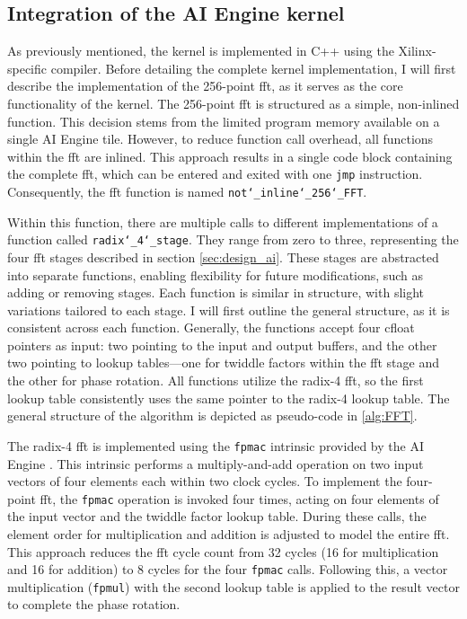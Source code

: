 \subsection{Integration of the AI Engine kernel} \label{sec:aie_im}
As previously mentioned, the kernel is implemented in C++ using the Xilinx-specific compiler. Before detailing the complete kernel implementation, I will first describe the implementation of the 256-point \ac{fft}, as it serves as the core functionality of the kernel. The 256-point \ac{fft} is structured as a simple, non-inlined function. This decision stems from the limited program memory available on a single AI Engine tile. However, to reduce function call overhead, all functions within the \ac{fft} are inlined. This approach results in a single code block containing the complete \ac{fft}, which can be entered and exited with one \texttt{jmp} instruction. Consequently, the \ac{fft} function is named \texttt{not\char`_inline\char`_256\char`_FFT}.\par
Within this function, there are multiple calls to different implementations of a function called \texttt{radix\char`_4\char`_stage}. They range from zero to three, representing the four \ac{fft} stages described in section \ref{sec:design_ai}. These stages are abstracted into separate functions, enabling flexibility for future modifications, such as adding or removing stages. Each function is similar in structure, with slight variations tailored to each stage. I will first outline the general structure, as it is consistent across each function. Generally, the functions accept four cfloat pointers as input: two pointing to the input and output buffers, and the other two pointing to lookup tables—one for twiddle factors within the \ac{fft} stage and the other for phase rotation. All functions utilize the radix-4 \ac{fft}, so the first lookup table consistently uses the same pointer to the radix-4 lookup table. The general structure of the algorithm is depicted as pseudo-code in \ref{alg:FFT}.\par
The radix-4 \ac{fft} is implemented using the \texttt{fpmac} intrinsic provided by the AI Engine \cite{AMD_aie_intrinsics}. This intrinsic performs a multiply-and-add operation on two input vectors of four elements each within two clock cycles. To implement the four-point \ac{fft}, the \texttt{fpmac} operation is invoked four times, acting on four elements of the input vector and the twiddle factor lookup table. During these calls, the element order for multiplication and addition is adjusted to model the entire \ac{fft}. This approach reduces the \ac{fft} cycle count from 32 cycles (16 for multiplication and 16 for addition) to 8 cycles for the four \texttt{fpmac} calls. Following this, a vector multiplication (\texttt{fpmul}) with the second lookup table is applied to the result vector to complete the phase rotation.\par
